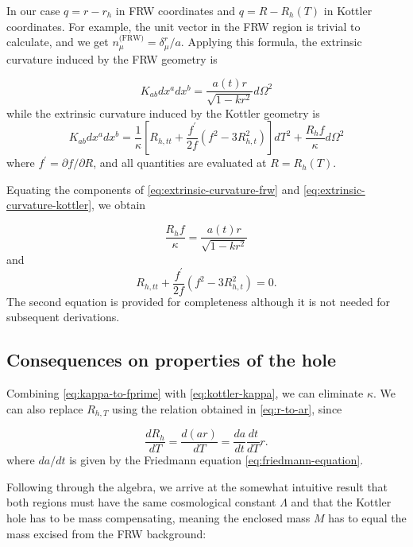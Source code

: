 In our case $q = r-r_h$ in FRW coordinates and $q = R - R_h(T)$ in Kottler coordinates. For example, the unit vector in the FRW region is trivial to calculate, and we get $n_{\mu}^{\text{(FRW)}} = \delta^r_{\mu}/a$. Applying this formula, the extrinsic curvature induced by the FRW geometry is

\begin{equation}
  K_{ab} dx^a dx^b = \frac{a(t)r}{\sqrt{1-kr^2}} d \Omega^2
  \label{eq:extrinsic-curvature-frw}
\end{equation}
while the extrinsic curvature induced by the Kottler geometry is
\begin{equation}
  K_{ab} dx^a dx^b = \frac{1}{\kappa} \left [ R_{h,tt} + \frac{f^{\prime}}{2f}(f^2 - 3R_{h,t}^2) \right ] dT^2 + \frac{R_h f}{\kappa} d \Omega^2
  \label{eq:extrinsic-curvature-kottler}
\end{equation}
where $f^{\prime} = \partial f / \partial R$, and all quantities are evaluated at $R = R_h(T)$.

Equating the components of \autoref{eq:extrinsic-curvature-frw} and \autoref{eq:extrinsic-curvature-kottler}, we obtain

\begin{equation}
  \frac{R_h f}{\kappa} = \frac{a(t)r}{\sqrt{1-kr^2}}
  \label{eq:kappa-to-fprime}
\end{equation}
and
\begin{equation}
  R_{h,tt} + \frac{f^{\prime}}{2f}(f^2 - 3R_{h,t}^2) = 0.
\end{equation}
The second equation is provided for completeness although it is not needed for subsequent derivations. 

\subsection{Consequences on properties of the hole}

Combining \autoref{eq:kappa-to-fprime} with \autoref{eq:kottler-kappa}, we can eliminate $\kappa$. We can also replace $R_{h,T}$ using the relation obtained in \autoref{eq:r-to-ar}, since

\begin{equation}
  \frac{dR_h}{dT} = \frac{d(ar)}{dT} = \frac{da}{dt}\frac{dt}{dT}r.
\end{equation}
where $da/dt$ is given by the Friedmann equation \ref{eq:friedmann-equation}. 

Following through the algebra, we arrive at the somewhat intuitive result that both regions must have the same cosmological constant $\Lambda$ and that the Kottler hole has to be mass compensating, meaning the enclosed mass $M$ has to equal the mass excised from the FRW background:

